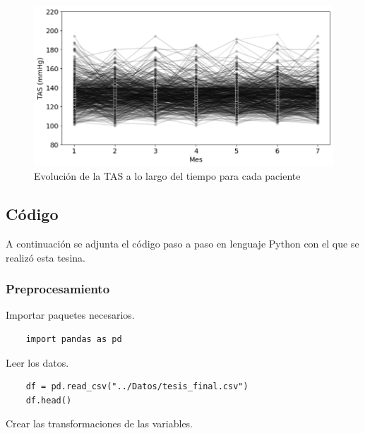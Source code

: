\documentclass[spanish]{article}
\numberwithin{figure}{subsection}
\numberwithin{equation}{subsection}
\numberwithin{table}{subsection}
\begin{document}
\begin{figure}[H]
	\centering
	\includegraphics[scale=0.5]{img/TAS_vs_tpo_perfiles_individuales.png}
	\caption{Evolución de la TAS a lo largo del tiempo para cada paciente}
	\label{perfiles_individuales}
\end{figure}

\subsection{Código}

A continuación se adjunta el código paso a paso en lenguaje Python con el que se
realizó esta tesina.

\subsubsection{Preprocesamiento}

Importar paquetes necesarios.

\begin{lstlisting}
	import pandas as pd
\end{lstlisting}

Leer los datos.

\begin{lstlisting}
	df = pd.read_csv("../Datos/tesis_final.csv")
	df.head()
\end{lstlisting}

Crear las transformaciones de las variables.
\end{document}
